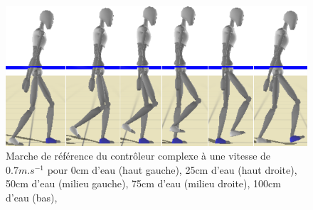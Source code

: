 \documentclass[runningheads,a4paper]{llncs}
\begin{document}
\begin{figure}[!h]
\includegraphics[scale=0.3]{strips/3_6_1_100cm.png}
\caption{Marche de référence du contrôleur complexe à une vitesse de $0.7m.s^{-1}$ pour 0cm d'eau (haut gauche), 25cm d'eau (haut droite), 50cm d'eau (milieu gauche), 75cm d'eau (milieu droite), 100cm d'eau (bas), }
\label{fig:joint_space_motion_control}
\label{fig:state_machine}
\end{figure}


\newpage
\end{document}
